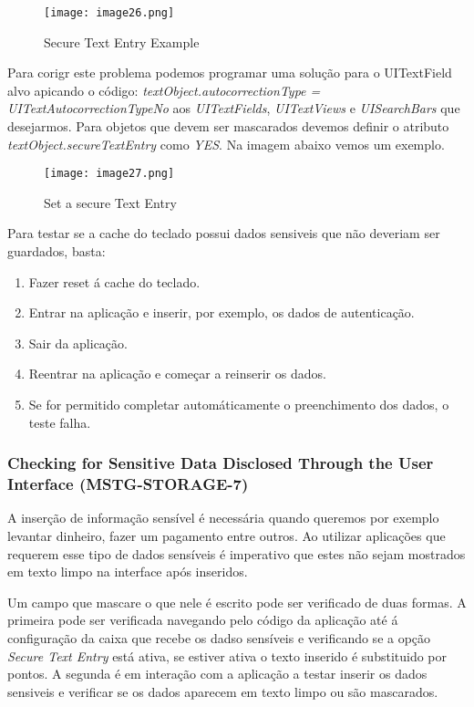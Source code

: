\begin{figure}[H]
\centering
\texttt{[image: image26.png]}
\caption {Secure Text Entry Example}
\label {fig02}
\end{figure}



Para corigr este problema podemos programar uma solução para o UITextField alvo apicando o código: \textit{textObject.autocorrectionType = UITextAutocorrectionTypeNo} aos \textit{UITextFields}, \textit{UITextViews} e \textit{UISearchBars} que desejarmos. Para objetos que devem ser mascarados devemos definir o atributo \textit{textObject.secureTextEntry} como \textit{YES}.  Na imagem abaixo vemos um exemplo.
	 
\begin{figure}[H]
\centering
\texttt{[image: image27.png]}
\caption {Set a secure Text Entry}
\label {fig02}
\end{figure}

Para testar se a cache do teclado possui dados sensiveis que não deveriam ser guardados, basta:
\begin{enumerate}
	\item Fazer reset á cache do teclado.
	\item Entrar na aplicação e inserir, por exemplo, os dados de autenticação.
	\item Sair da aplicação.
	\item Reentrar na aplicação e começar a reinserir os dados. 
	\item Se for permitido completar automáticamente o preenchimento dos dados, o teste falha.
\end{enumerate}



\subsubsection{Checking for Sensitive Data Disclosed Through the User Interface (MSTG-STORAGE-7)}
\hfill\par
\hfill\par


A inserção de informação sensível é necessária quando queremos por exemplo levantar dinheiro, fazer um pagamento entre outros. Ao utilizar aplicações que requerem esse tipo de dados sensíveis é imperativo que estes não sejam mostrados em texto limpo na interface após inseridos.\par
\hfill\par
Um campo que mascare o que nele é escrito pode ser verificado de duas formas.
A primeira pode ser verificada navegando pelo código da aplicação até á configuração da caixa que recebe os dadso sensíveis e verificando se a opção \textit{Secure Text Entry} está ativa, se estiver ativa o texto inserido é substituido por pontos.
A segunda é em interação com a aplicação a testar inserir os dados sensiveis e verificar se os dados aparecem em texto limpo ou são mascarados.



